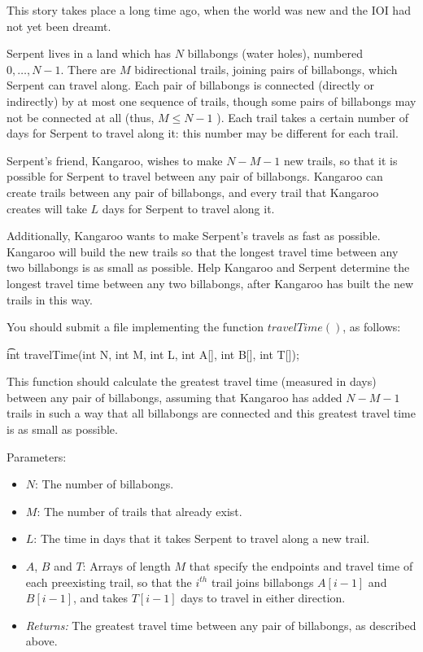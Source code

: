 This story takes place a long time ago, when the world was new and the IOI had not yet
been dreamt.

Serpent lives in a land which has $N$ billabongs (water holes), numbered $0, \dots, N ­- 1$.
There are $M$ bidirectional trails, joining pairs of billabongs, which Serpent can travel
along. Each pair of billabongs is connected (directly or indirectly) by at most one sequence
of trails, though some pairs of billabongs may not be connected at all (thus, $M \leq N - ­1$ ). Each
trail takes a certain number of days for Serpent to travel along it: this number may be
different for each trail.

Serpent's friend, Kangaroo, wishes to make $N -­ M ­- 1$ new trails, so that it is possible for
Serpent to travel between any pair of billabongs. Kangaroo can create trails between any
pair of billabongs, and every trail that Kangaroo creates will take $L$ days for Serpent to
travel along it.

Additionally, Kangaroo wants to make Serpent's travels as fast as possible. Kangaroo will
build the new trails so that the longest travel time between any two billabongs is as small as
possible. Help Kangaroo and Serpent determine the longest travel time between any two
billabongs, after Kangaroo has built the new trails in this way.

You should submit a file implementing the function $travelTime()$, as follows:

\t{int travelTime(int N, int M, int L, int A[], int B[], int T[]);}

This function should calculate the greatest travel time (measured in days) between any pair
of billabongs, assuming that Kangaroo has added $N ­- M ­- 1$ trails in such a way that all
billabongs are connected and this greatest travel time is as small as possible.

Parameters:
\begin{itemize}
\item $N$: The number of billabongs.
\item $M$: The number of trails that already exist.
\item $L$: The time in days that it takes Serpent to travel along a new trail.
\item $A$, $B$ and $T$: Arrays of length $M$ that specify the endpoints and travel time of
each pre­existing trail, so that the $i^{th}$ trail joins billabongs $A[i­-1]$ and $B[i - 1]$,
and takes $T[i-­1]$ days to travel in either direction.
\item \textit{Returns:} The greatest travel time between any pair of billabongs, as described above.
\end{itemize}